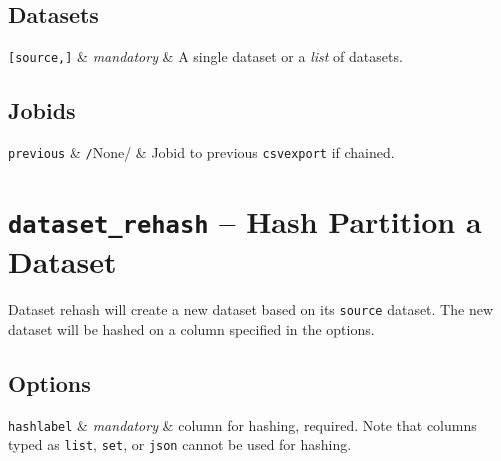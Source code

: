 \subsection*{Datasets}
\starttable
  \RP \texttt{[source,]} & \textsl{mandatory} & A single
  dataset or a \textsl{list} of datasets.\\[1ex]
\stoptable


\subsection*{Jobids}
\starttable
  \texttt{previous} & \texttt/None/ & Jobid to
  previous \texttt{csvexport} if chained.\\[1ex]
\stoptable
















\clearpage
\section{\texttt{dataset\_rehash} -- Hash Partition a Dataset}

Dataset rehash will create a new dataset based on its \texttt{source}
dataset.  The new dataset will be hashed on a column specified in the
options.

\subsection*{Options}
\starttable
  \RP \texttt{hashlabel} & \textsl{mandatory} & column for hashing,
  required.  Note that columns typed as \texttt{list}, \texttt{set},
  or \texttt{json} cannot be used for hashing.\\

